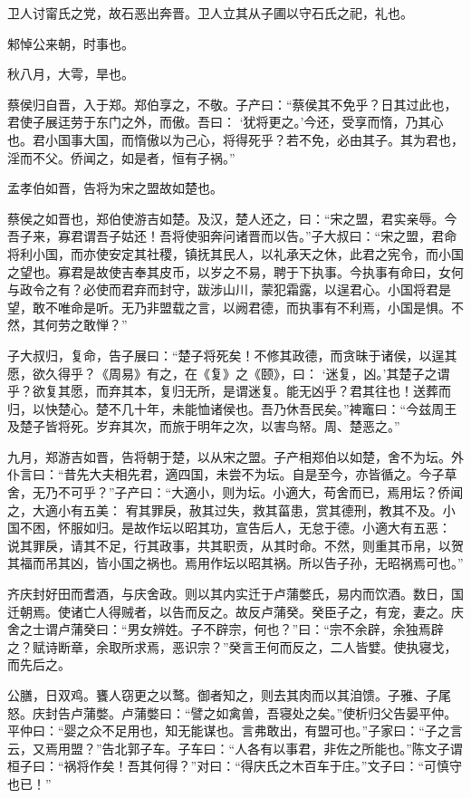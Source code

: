 \documentclass[a4paper,12pt,UTF8,twoside]{ctexbook}
\begin{document}
卫人讨甯氏之党，故石恶出奔晋。卫人立其从子圃以守石氏之祀，礼也。

邾悼公来朝，时事也。

秋八月，大雩，旱也。

蔡侯归自晋，入于郑。郑伯享之，不敬。子产曰：“蔡侯其不免乎？日其过此也，君使子展迋劳于东门之外，而傲。吾曰： ‘犹将更之。’今还，受享而惰，乃其心也。君小国事大国，而惰傲以为己心，将得死乎？若不免，必由其子。其为君也，淫而不父。侨闻之，如是者，恒有子祸。”

孟孝伯如晋，告将为宋之盟故如楚也。

蔡侯之如晋也，郑伯使游吉如楚。及汉，楚人还之，曰：“宋之盟，君实亲辱。今吾子来，寡君谓吾子姑还！吾将使驲奔问诸晋而以告。”子大叔曰：“宋之盟，君命将利小国，而亦使安定其社稷，镇抚其民人，以礼承天之休，此君之宪令，而小国之望也。寡君是故使吉奉其皮币，以岁之不易，聘于下执事。今执事有命曰，女何与政令之有？必使而君弃而封守，跋涉山川，蒙犯霜露，以逞君心。小国将君是望，敢不唯命是听。无乃非盟载之言，以阙君德，而执事有不利焉，小国是惧。不然，其何劳之敢惮？”

子大叔归，复命，告子展曰：“楚子将死矣！不修其政德，而贪昧于诸侯，以逞其愿，欲久得乎？《周易》有之，在《复》之《颐》，曰： ‘迷复，凶。’其楚子之谓乎？欲复其愿，而弃其本，复归无所，是谓迷复。能无凶乎？君其往也！送葬而归，以快楚心。楚不几十年，未能恤诸侯也。吾乃休吾民矣。”裨竈曰：“今兹周王及楚子皆将死。岁弃其次，而旅于明年之次，以害鸟帑。周、楚恶之。”

九月，郑游吉如晋，告将朝于楚，以从宋之盟。子产相郑伯以如楚，舍不为坛。外仆言曰：“昔先大夫相先君，適四国，未尝不为坛。自是至今，亦皆循之。今子草舍，无乃不可乎？”子产曰：“大適小，则为坛。小適大，苟舍而已，焉用坛？侨闻之，大適小有五美： 宥其罪戾，赦其过失，救其菑患，赏其德刑，教其不及。小国不困，怀服如归。是故作坛以昭其功，宣告后人，无怠于德。小適大有五恶： 说其罪戾，请其不足，行其政事，共其职贡，从其时命。不然，则重其币帛，以贺其福而吊其凶，皆小国之祸也。焉用作坛以昭其祸。所以告子孙，无昭祸焉可也。”

齐庆封好田而耆酒，与庆舍政。则以其内实迁于卢蒲嫳氏，易内而饮酒。数日，国迁朝焉。使诸亡人得贼者，以告而反之。故反卢蒲癸。癸臣子之，有宠，妻之。庆舍之士谓卢蒲癸曰：“男女辨姓。子不辟宗，何也？”曰：“宗不余辟，余独焉辟之？赋诗断章，余取所求焉，恶识宗？”癸言王何而反之，二人皆嬖。使执寝戈，而先后之。

公膳，日双鸡。饔人窃更之以鹜。御者知之，则去其肉而以其洎馈。子雅、子尾怒。庆封告卢蒲嫳。卢蒲嫳曰：“譬之如禽兽，吾寝处之矣。”使析归父告晏平仲。平仲曰：“婴之众不足用也，知无能谋也。言弗敢出，有盟可也。”子家曰：“子之言云，又焉用盟？”告北郭子车。子车曰：“人各有以事君，非佐之所能也。”陈文子谓桓子曰：“祸将作矣！吾其何得？”对曰：“得庆氏之木百车于庄。”文子曰：“可慎守也已！”
\end{document}
